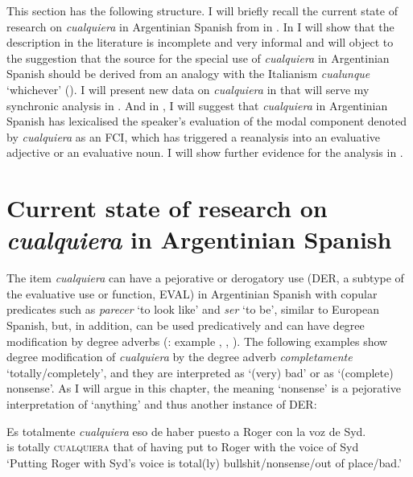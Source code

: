 This section has the following structure. I will briefly recall the current state of research on \textit{cualquiera} in Argentinian Spanish from  in . In  I will show that the description in the literature is incomplete and very informal and will object to the suggestion that the source for the special use of \textit{cualquiera} in Argentinian Spanish should be derived from an analogy with the Italianism \textit{cualunque} ‘whichever’ (\cite{Rizzosalierno2013}). I will present new data on \textit{cualquiera} in  that will serve my synchronic analysis in . And in , I will suggest that \textit{cualquiera} in Argentinian Spanish has lexicalised the speaker’s evaluation of the modal component denoted by \textit{cualquiera} as an FCI, which has triggered a reanalysis into an evaluative adjective or an evaluative noun. I will show further evidence for the analysis in .

\section{{Current} {state} {of} {research} {on \textit{cualquiera}} {in} {Argentinian} {Spanish}} \label{sec:4.1}

The item \textit{cualquiera} can have a pejorative or derogatory use (DER, a subtype of the evaluative use or function, EVAL) in Argentinian Spanish with copular predicates such as \textit{parecer} ‘to look like’ and \textit{ser} ‘to be’, similar to European Spanish, but, in addition, can be used predicatively and can have degree modification by degree adverbs (\citealt{Rizzosalierno2013}: example , , ). The following examples show degree modification of \textit{cualquiera} by the degree adverb \textit{completamente} ‘totally/completely’, and they are interpreted as ‘(very) bad’ or as ‘(complete) nonsense’. As I will argue in this chapter, the meaning ‘nonsense’ is a pejorative interpretation of ‘anything’ and thus another instance of DER:

\ea \label{ex:key:187} %
    \gll Es totalmente \textit{cualquiera} eso de haber puesto a Roger con la voz de Syd.\\
    is totally \textsc{cualquiera} that of having put to Roger with the voice  of  Syd\\
    \glt ‘Putting Roger with Syd's voice is total(ly) bullshit/nonsense/out of place/bad.’

